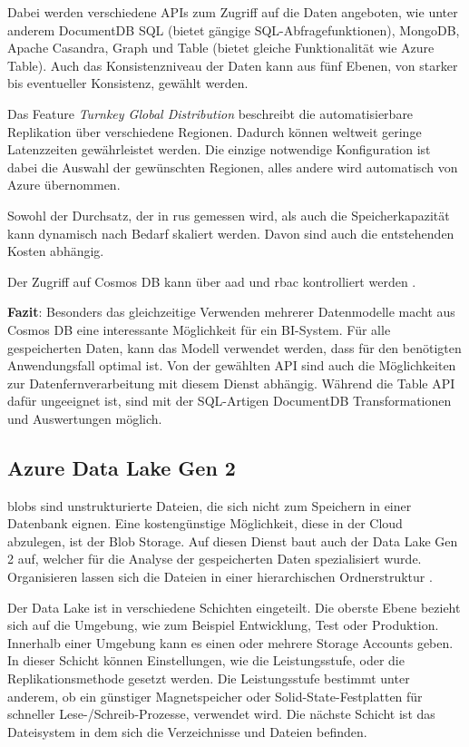 Dabei werden verschiedene APIs zum Zugriff auf die Daten angeboten, wie unter anderem DocumentDB SQL (bietet gängige SQL-Abfragefunktionen), MongoDB, Apache Casandra, Graph und Table (bietet gleiche Funktionalität wie Azure Table). Auch das Konsistenzniveau der Daten kann aus fünf Ebenen, von starker bis eventueller Konsistenz, gewählt werden.

Das Feature \textit{Turnkey Global Distribution} beschreibt die automatisierbare Replikation über verschiedene Regionen. Dadurch können weltweit geringe Latenzzeiten gewährleistet werden. Die einzige notwendige Konfiguration ist dabei die Auswahl der gewünschten Regionen, alles andere wird automatisch von Azure übernommen.

Sowohl der Durchsatz, der in \acp{ru} gemessen wird, als auch die Speicherkapazität kann dynamisch nach Bedarf skaliert werden. Davon sind auch die entstehenden Kosten abhängig.
\cite{guay_paz_microsoft_2018}\cite{mrzyglod_hands-azure_2018}

Der Zugriff auf Cosmos DB kann über \ac{aad} und \ac{rbac} kontrolliert werden \cite{weiss_azure_2021}.

\textbf{Fazit}: Besonders das gleichzeitige Verwenden mehrerer Datenmodelle macht aus Cosmos DB eine interessante Möglichkeit für ein BI-System. Für alle gespeicherten Daten, kann das Modell verwendet werden, dass für den benötigten Anwendungsfall optimal ist. Von der gewählten API sind auch die Möglichkeiten zur Datenfernverarbeitung mit diesem Dienst abhängig. Während die Table API dafür ungeeignet ist, sind mit der SQL-Artigen DocumentDB Transformationen und Auswertungen möglich.


\subsection{Azure Data Lake Gen 2} \label{sec:grundlagen:azure_dienste:dataLake}
\acp{blob} sind unstrukturierte Dateien, die sich nicht zum Speichern in einer Datenbank eignen. Eine kostengünstige Möglichkeit, diese in der Cloud abzulegen, ist der Blob Storage. Auf diesen Dienst baut auch der Data Lake Gen 2 auf, welcher für die Analyse der gespeicherten Daten spezialisiert wurde. Organisieren lassen sich die Dateien in einer hierarchischen Ordnerstruktur \cite{soh_microsoft_2020}.

Der Data Lake ist in verschiedene Schichten eingeteilt. Die oberste Ebene bezieht sich auf die Umgebung, wie zum Beispiel Entwicklung, Test oder Produktion. Innerhalb einer Umgebung kann es einen oder mehrere Storage Accounts geben. In dieser Schicht können Einstellungen, wie die Leistungsstufe, oder die Replikationsmethode gesetzt werden. Die Leistungsstufe bestimmt unter anderem, ob ein günstiger Magnetspeicher oder Solid-State-Festplatten für schneller Lese-/Schreib-Prozesse, verwendet wird. Die nächste Schicht ist das Dateisystem in dem sich die Verzeichnisse und Dateien befinden.

